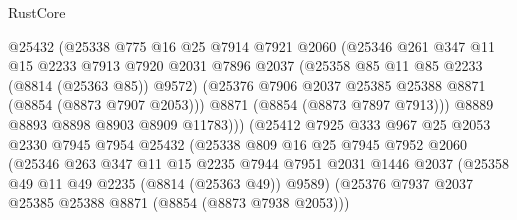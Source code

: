 \begin{lexlean}{RustCore}
\begin{coremodule}
                              @25432
                              (@25338
                                @775
                                @16
                                @25
                                @7914
                                @7921
                                @2060
                                (@25346
                                  @261
                                  @347
                                  @11
                                  @15
                                  @2233
                                  @7913
                                  @7920
                                  @2031
                                  @7896
                                  @2037
                                  (@25358 @85 @11 @85 @2233 (@8814 (@25363 @85)) @9572)
                                  (@25376
                                    @7906
                                    @2037
                                    @25385
                                    @25388
                                    @8871
                                    (@8854 (@8873 @7907 @2053)))
                                  @8871
                                  (@8854 (@8873 @7897 @7913)))
                                @8889
                                @8893
                                @8898
                                @8903
                                @8909
                                @11783)))
                          (@25412
                            @7925
                            @333
                            @967
                            @25
                            @2053
                            @2330
                            @7945
                            @7954
                            @25432
                            (@25338
                              @809
                              @16
                              @25
                              @7945
                              @7952
                              @2060
                              (@25346
                                @263
                                @347
                                @11
                                @15
                                @2235
                                @7944
                                @7951
                                @2031
                                @1446
                                @2037
                                (@25358 @49 @11 @49 @2235 (@8814 (@25363 @49)) @9589)
                                (@25376 @7937 @2037 @25385 @25388 @8871 (@8854 (@8873 @7938 @2053)))

\end{coremodule}
\end{lexlean}

